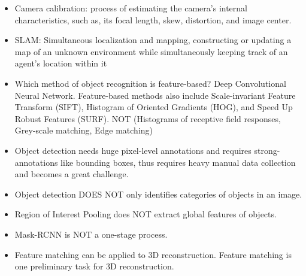 \documentclass[10pt]{article}
\begin{document}
\begin{itemize}[label=\(\star\), leftmargin=1em, itemsep=-0.3em]
    \item Camera calibration:  process of estimating the camera's internal characteristics, such as, its focal length, skew, distortion, and image center.
    \item  SLAM: Simultaneous localization and mapping, constructing or updating a map of an unknown environment while simultaneously keeping track of an agent's location within it
    \item Which method of object recognition is feature-based? Deep Convolutional Neural Network. Feature-based methods also include Scale-invariant Feature Transform (SIFT), Histogram of Oriented Gradients (HOG), and Speed Up Robust Features (SURF). NOT (Histograms of receptive field responses, Grey-scale matching, Edge matching)
    \item Object detection needs huge pixel-level annotations and requires strong-annotations like bounding boxes, thus requires heavy manual data collection and becomes a great challenge.
    \item Object detection DOES NOT only identifies categories of objects in an image.
    \item Region of Interest Pooling does NOT extract global features of objects.
    \item Mask-RCNN is NOT a one-stage process.
    \item Feature matching can be applied to 3D reconstruction. Feature matching is one preliminary task for 3D reconstruction.


\end{itemize}
\end{document}
